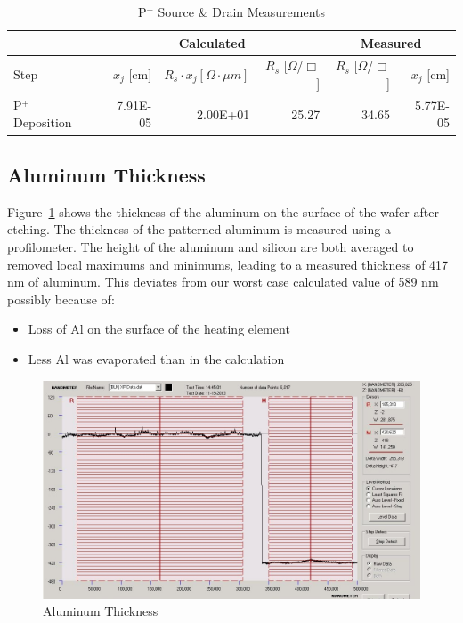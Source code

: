 \documentclass[letter,12pt]{article}
\begin{document}
		\begin{table}[h!]
			\centering
			\begin{tabular}{l || r | r | r || r | r}
				~ & \multicolumn{3}{c}{Calculated} & \multicolumn{2}{c}{Measured} \\
				\hline
				Step & $x_j$ [cm] & $R_s \cdot x_j [\Omega\cdot\mu m]$ & $R_s$ [$\Omega$/$\Box$] &  $R_s$ [$\Omega$/$\Box$] & $x_j$ [cm] \\
				\hline
				P$^+$ Deposition & 7.91E-05 & 2.00E+01 & 25.27 & 34.65 & 5.77E-05 \\
			\end{tabular}
			\caption{P$^+$ Source \& Drain Measurements}
			\label{tab:P+_Measurements}
		\end{table}
			
	\FloatBarrier
	\subsection{Aluminum Thickness}
		Figure~\ref{fig:Al_Thickness} shows the thickness of the aluminum on the surface of the wafer after etching. The thickness of the patterned aluminum is measured using a profilometer. The height of the aluminum and silicon are both averaged to removed local maximums and minimums, leading to a measured thickness of 417 nm of aluminum. This deviates from our worst case calculated value of 589 nm possibly because of:
		\begin{itemize}
			\item Loss of Al on the surface of the heating element
			\item Less Al was evaporated than in the calculation
		\end{itemize}
		
		\begin{figure}[h!]
			\centering
			\includegraphics[width=\textwidth]{./Images/Harkness_Step.jpg}
			\caption{Aluminum Thickness}
			\label{fig:Al_Thickness}
		\end{figure}
\end{document}
